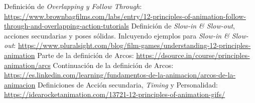 \documentclass{article}
\begin{document}
\begin{thebibliography}{1}
     Definición de \textit{Overlapping y Follow Through}: \url{https://www.brownbagfilms.com/labs/entry/12-principles-of-animation-follow-through-and-overlapping-action-tutorials} 
     Definición de \textit{Slow-in \& Slow-out}, acciones secundarias y poses sólidas. Inlcuyendo ejemplos para \textit{Slow-in \& Slow-out}: \url{https://www.pluralsight.com/blog/film-games/understanding-12-principles-animation}
     Parte de la definición de Arcos: \url{https://dsource.in/course/principles-animation/arcs}
     Continuación de la definición de Arcos: \url{https://es.linkedin.com/learning/fundamentos-de-la-animacion/arcos-de-la-animacion}
     Definiciones de Acción secundaria, \textit{Timing} y Personalidad: \url{https://idearocketanimation.com/13721-12-principles-of-animation-gifs/}
\end{thebibliography}
\end{document}
